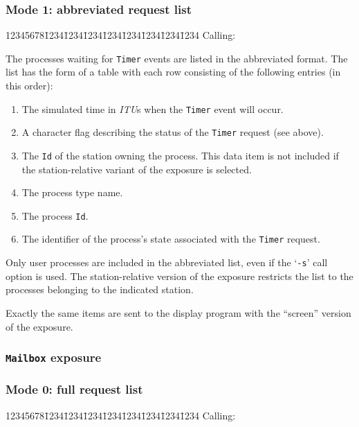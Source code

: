 \subsubsection*{Mode 1: abbreviated request list}

{\tt\begin{tabbing}
12345678\=1234\=1234\=1234\=1234\=1234\=1234\=1234\=1234\kill
{\rm Calling:}
\end{tabbing}}

The processes waiting for {\tt Timer} events are listed in the
abbreviated format.
The list has the form of a table with each row consisting of the
following entries (in this order):

\begin{enumerate}
\item
The simulated time in {\em ITU\/}s when the {\tt Timer} event will occur.
\item
A character flag describing the status of the {\tt Timer} request (see above).
\item
The {\tt Id} of the station owning the process.
This data item is not included if the station-relative variant of the
exposure is selected.
\item
The process type name.
\item
The process {\tt Id}.
\item
The identifier of the process's state associated with the {\tt Timer} request.
\end{enumerate}

Only user processes are included in the abbreviated list, even if the
`{\tt -s}' call option is used.
The station-relative version of the exposure restricts the list to the processes
belonging to the indicated station.

Exactly the same items are sent to the display program with the ``screen''
version of the exposure.

\subsubsection{{\tt Mailbox} exposure}
\label{rm_ex_se_mb}

\subsubsection*{Mode 0: full request list}

{\tt\begin{tabbing}
12345678\=1234\=1234\=1234\=1234\=1234\=1234\=1234\=1234\kill
{\rm Calling:}
\end{tabbing}}

